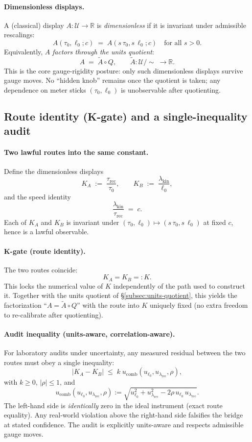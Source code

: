 \documentclass[11pt]{article}
\begin{document}
\paragraph{Dimensionless displays.}
A (classical) display $A:\mathcal{U}\to\mathbb{R}$ is \emph{dimensionless} if it is invariant under admissible rescalings:
\[
A(\tau_0,\ell_0;c)\;=\;A(s\,\tau_0,s\,\ell_0;c)\quad\text{for all }s>0.
\]
Equivalently, $A$ \emph{factors through the units quotient}:
\[
A \;=\; \tilde A\circ Q,\qquad \tilde A:\mathcal{U}/\!\sim\;\to\mathbb{R}.
\]
This is the core gauge-rigidity posture: only such dimensionless displays survive gauge moves. No ``hidden knob'' remains once the quotient is taken; any dependence on meter sticks $(\tau_0,\ell_0)$ is unobservable after quotienting. %

\subsection{Route identity (K-gate) and a single-inequality audit}\label{subsec:kgate}

\paragraph{Two lawful routes into the same constant.}
Define the dimensionless displays
\[
K_A \;:=\; \frac{\tau_{\mathrm{rec}}}{\tau_0},
\qquad
K_B \;:=\; \frac{\lambda_{\mathrm{kin}}}{\ell_0},
\]
and the speed identity
\[
\frac{\lambda_{\mathrm{kin}}}{\tau_{\mathrm{rec}}} \;=\; c.
\]
Each of $K_A$ and $K_B$ is invariant under $(\tau_0,\ell_0)\mapsto (s\,\tau_0,s\,\ell_0)$ at fixed $c$, hence is a lawful observable.

\paragraph{K-gate (route identity).}
The two routes coincide:
\[
\boxed{K_A = K_B =: K}.
\]
This locks the numerical value of $K$ independently of the path used to construct it. Together with the units quotient of \S\ref{subsec:units-quotient}, this yields the factorization ``$A=\tilde A\circ Q$'' with the route into $K$ uniquely fixed (no extra freedom to re-calibrate after quotienting). %

\paragraph{Audit inequality (units-aware, correlation-aware).}
For laboratory audits under uncertainty, any measured residual between the two routes must obey a single inequality:
\[
\bigl|K_A-K_B\bigr|\;\le\; k\; u_{\mathrm{comb}}(u_{\ell_0},u_{\lambda_{\mathrm{rec}}},\rho),
\]
with $k\ge 0$, $|\rho|\le 1$, and
\[
u_{\mathrm{comb}}(u_{\ell_0},u_{\lambda_{\mathrm{rec}}},\rho)
:= \sqrt{u_{\ell_0}^2 + u_{\lambda_{\mathrm{rec}}}^2 - 2\rho\,u_{\ell_0}\,u_{\lambda_{\mathrm{rec}}}}.
\]
The left-hand side is \emph{identically} zero in the ideal instrument (exact route equality). Any real-world violation above the right-hand side falsifies the bridge at stated confidence. The audit is explicitly units-aware and respects admissible gauge moves.
\end{document}
